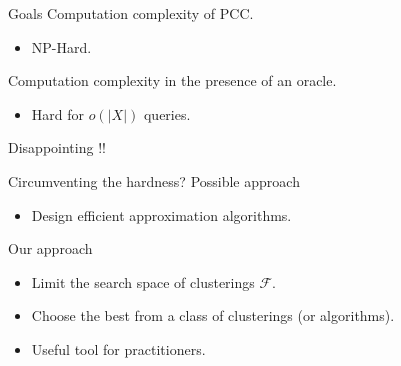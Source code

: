 \documentclass{beamer}
\newcommand{\mc}{\mathcal}
\begin{document}
\begin{frame}{Goals}
	Computation complexity of PCC.
	\begin{itemize}
		\vspace{10pt}\item NP-Hard.
	\end{itemize}	 
	\vspace{10pt}Computation complexity in the presence of an oracle.
	\begin{itemize}
		\vspace{10pt}\item Hard for $o(|X|)$ queries.
	\end{itemize}

    \Huge{
    \begin{center}
    	Disappointing !!\\
    	\Frowny{} 
   	\end{center}
    }
\end{frame}

\begin{frame}{Circumventing the hardness?}
	Possible approach
	\begin{itemize}
		\item Design efficient approximation algorithms.		
	\end{itemize}
	
	\vspace{30pt}Our approach
	\begin{itemize}
		\vspace{5pt}\item Limit the search space of clusterings $\mc F$.
		\vspace{5pt}\item Choose the best from a class of clusterings (or algorithms).
		\vspace{5pt}\item Useful tool for practitioners. 
	\end{itemize}
\end{frame}
\end{document}
